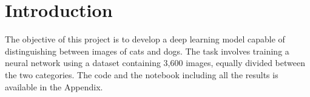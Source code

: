 \section{Introduction}
The objective of this project is to develop a deep learning model capable of distinguishing between images of cats and dogs.
The task involves training a neural network using a dataset containing 3,600 images, equally divided between the two categories. The code and the notebook including all the results is available in the Appendix.

